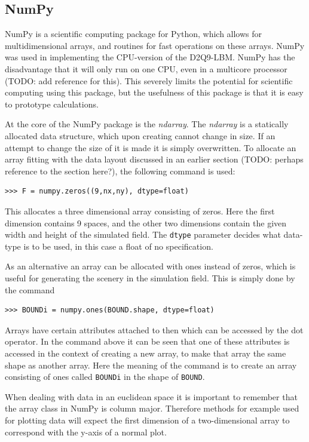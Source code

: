 \subsection{NumPy}
NumPy is a scientific computing package for Python, which allows for multidimensional arrays, and routines for fast operations on these arrays. NumPy was used in implementing the CPU-version of the D2Q9-LBM. NumPy has the disadvantage that it will only run on one CPU, even in a multicore processor (TODO: add reference for this). This severely limits the potential for scientific computing using this package, but the usefulness of this package is that it is easy to prototype calculations.

At the core of the NumPy package is the \textit{ndarray}. The \textit{ndarray} is a statically allocated data structure, which upon creating cannot change in size. If an attempt to change the size of it is made it is simply overwritten. To allocate an array fitting with the data layout discussed in an earlier section (TODO: perhaps reference to the section here?), the following command is used:

\begin{verbatim}
>>> F = numpy.zeros((9,nx,ny), dtype=float)
\end{verbatim}

This allocates a three dimensional array consisting of zeros. Here the first dimension contains 9 spaces, and the other two dimensions contain the given width and height of the simulated field. The \texttt{dtype} parameter decides what data-type is to be used, in this case a float of no specification. 

As an alternative an array can be allocated with ones instead of zeros, which is useful for generating the scenery in the simulation field. This is simply done by the command

\begin{verbatim}
>>> BOUNDi = numpy.ones(BOUND.shape, dtype=float)
\end{verbatim}

Arrays have certain attributes attached to then which can be accessed by the dot operator. In the command above it can be seen that one of these attributes is accessed in the context of creating a new array, to make that array the same shape as another array. Here the meaning of the command is to create an array consisting of ones called \texttt{BOUNDi} in the shape of \texttt{BOUND}.

When dealing with data in an euclidean space it is important to remember that the array class in NumPy is column major. Therefore methods for example used for plotting data will expect the first dimension of a two-dimensional array to correspond with the y-axis of a normal plot. 

